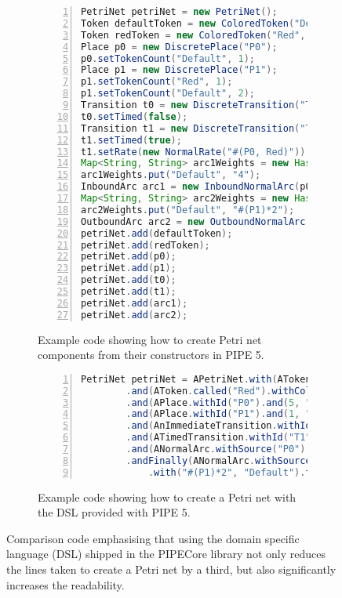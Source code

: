 \begin{figure}[tb]
\centering
\begin{subfigure}[b]{\linewidth}
\vspace{0.5cm}
\begin{lstlisting}[numbers=left, language=Java, frame=single]
PetriNet petriNet = new PetriNet();
Token defaultToken = new ColoredToken("Default", Color.BLACK);
Token redToken = new ColoredToken("Red", Color.RED);
Place p0 = new DiscretePlace("P0");
p0.setTokenCount("Default", 1);
Place p1 = new DiscretePlace("P1");
p1.setTokenCount("Red", 1);
p1.setTokenCount("Default", 2);
Transition t0 = new DiscreteTransition("T0");
t0.setTimed(false);
Transition t1 = new DiscreteTransition("T1");
t1.setTimed(true);
t1.setRate(new NormalRate("#(P0, Red)"));
Map<String, String> arc1Weights = new HashMap<>();
arc1Weights.put("Default", "4");
InboundArc arc1 = new InboundNormalArc(p0, t0, arc1Weights);
Map<String, String> arc2Weights = new HashMap<>();
arc2Weights.put("Default", "#(P1)*2");
OutboundArc arc2 = new OutboundNormalArc(t0, p0, arc2Weights);
petriNet.add(defaultToken);
petriNet.add(redToken);
petriNet.add(p0);
petriNet.add(p1);
petriNet.add(t0);
petriNet.add(t1);
petriNet.add(arc1);
petriNet.add(arc2);
\end{lstlisting}
\caption{Example code showing how to create Petri net components from their constructors in PIPE 5.}
\end{subfigure}

\begin{subfigure}[b]{\linewidth}
\vspace{0.5cm}
\begin{lstlisting}[numbers=left,language=Java,frame=single]
PetriNet petriNet = APetriNet.with(AToken.called("Default").withColor(Color.BLACK))
        .and(AToken.called("Red").withColor(Color.RED))
        .and(APlace.withId("P0").and(5, "Default").tokens())
        .and(APlace.withId("P1").and(1, "Red").and(2, "Default").to())
        .and(AnImmediateTransition.withId("T0"))
        .and(ATimedTransition.withId("T1").andRate("#(P0, Red)"))
        .and(ANormalArc.withSource("P0").andTarget("T0").and("4", "Default").tokens())
        .andFinally(ANormalArc.withSource("T0").andTarget("P0")
            .with("#(P1)*2", "Default").tokens());
\end{lstlisting}
\caption{Example code showing how to create a Petri net with the DSL provided with PIPE 5.}
\end{subfigure}

\caption{Comparison code emphasising that using the domain specific language (DSL) shipped in the PIPECore library not only reduces the lines taken to create a Petri net by a third, but also significantly increases the readability.}
\label{lst:dsl}
\end{figure}